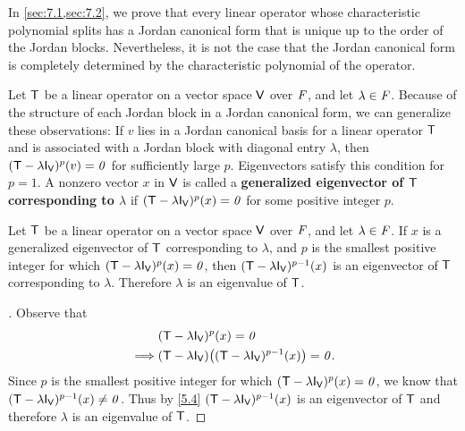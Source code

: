 \begin{note}
  In \cref{sec:7.1,sec:7.2}, we prove that every linear operator whose characteristic polynomial splits has a Jordan canonical form that is unique up to the order of the Jordan blocks.
  Nevertheless, it is not the case that the Jordan canonical form is completely determined by the characteristic polynomial of the operator.
\end{note}

\begin{defn}\label{7.1.2}
  Let \(\mathsf{T}\) be a linear operator on a vector space \(\mathsf{V}\) over \(\mathit{F}\), and let \(\lambda \in \mathit{F}\).
  Because of the structure of each Jordan block in a Jordan canonical form, we can generalize these observations:
  If \(v\) lies in a Jordan canonical basis for a linear operator \(\mathsf{T}\) and is associated with a Jordan block with diagonal entry \(\lambda\), then \((\T - \lambda \IT[\V])^p(v) = \zv\) for sufficiently large \(p\).
  Eigenvectors satisfy this condition for \(p = 1\).
  A nonzero vector \(x\) in \(\mathsf{V}\) is called a \textbf{generalized eigenvector of \(\mathsf{T}\) corresponding to \(\lambda\)} if \((\T - \lambda \IT[\V])^p(x) = \zv\) for some positive integer \(p\).
\end{defn}

\begin{cor}\label{7.1.3}
  Let \(\mathsf{T}\) be a linear operator on a vector space \(\mathsf{V}\) over \(\mathit{F}\), and let \(\lambda \in \mathit{F}\).
  If \(x\) is a generalized eigenvector of \(\mathsf{T}\) corresponding to \(\lambda\), and \(p\) is the smallest positive integer for which \((\T - \lambda \IT[\V])^p(x) = \zv\), then \((\T - \lambda \IT[\V])^{p - 1}(x)\) is an eigenvector of \(\mathsf{T}\) corresponding to \(\lambda\).
  Therefore \(\lambda\) is an eigenvalue of \(\mathsf{T}\).
\end{cor}

\begin{proof}[]
  Observe that
  \begin{align*}
             & (\T - \lambda \IT[\V])^p(x) = \zv                                   \\
    \implies & (\T - \lambda \IT[\V])\pa{(\T - \lambda \IT[\V])^{p - 1}(x)} = \zv.
  \end{align*}
  Since \(p\) is the smallest positive integer for which \((\T - \lambda \IT[\V])^p(x) = \zv\), we know that \((\T - \lambda \IT[\V])^{p - 1}(x) \neq \zv\).
  Thus by \cref{5.4} \((\T - \lambda \IT[\V])^{p - 1}(x)\) is an eigenvector of \(\mathsf{T}\) and therefore \(\lambda\) is an eigenvalue of \(\mathsf{T}\).
\end{proof}

